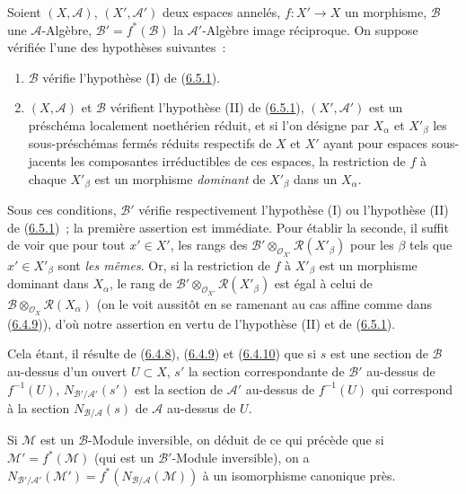 \begin{env}[6.5.4]
\label{II.6.5.4-fr}
Soient $(X,\mathcal{A})$, $(X',\mathcal{A}')$ deux espaces annelés,
$f:X'\to X$ un morphisme, $\mathcal{B}$ une $\mathcal{A}$-Algèbre,
$\mathcal{B}'=f^*(\mathcal{B})$ la $\mathcal{A}'$-Algèbre image réciproque. On
suppose vérifiée l'une des hypothèses suivantes~:
\begin{enumerate}
\item[$1^\circ$] $\mathcal{B}$ vérifie l'hypothèse (I) de
(\hyperref[II.6.5.1-fr]{6.5.1}).
\item[$2^\circ$] $(X,\mathcal{A})$ et $\mathcal{B}$ vérifient l'hypothèse
(II) de (\hyperref[II.6.5.1-fr]{6.5.1}), $(X',\mathcal{A}')$ est un préschéma
localement noethérien réduit, et si l'on désigne par $X_\alpha$ et
$X'_\beta$ les sous-préschémas fermés réduits respectifs de $X$ et $X'$ ayant
pour espaces sous-jacents les composantes irréductibles de ces espaces, la
restriction de $f$ à chaque $X'_\beta$ est un morphisme \emph{dominant} de
$X'_\beta$ dans un $X_\alpha$.
\end{enumerate}
Sous ces conditions, $\mathcal{B}'$ vérifie respectivement l'hypothèse (I) ou
l'hypothèse (II) de (\hyperref[II.6.5.1-fr]{6.5.1})~; la première assertion
est immédiate. Pour établir la seconde, il suffit de voir que pour tout
$x'\in X'$, les rangs des
$\mathcal{B}'\otimes_{\mathcal{O}_{X'}}\mathcal{R}(X'_\beta)$ pour les $\beta$
tels que $x'\in X'_\beta$ sont \emph{les mêmes}. Or, si la restriction de $f$
à $X'_\beta$ est un morphisme dominant dans $X_\alpha$, le rang de
$\mathcal{B}'\otimes_{\mathcal{O}_{X'}}\mathcal{R}(X'_\beta)$ est égal à celui
de $\mathcal{B}\otimes_{\mathcal{O}_X}\mathcal{R}(X_\alpha)$ (on le voit
aussitôt en se ramenant au cas affine comme dans
(\hyperref[II.6.4.9-fr]{6.4.9})), d'où notre assertion en vertu de l'hypothèse
(II) et de (\hyperref[II.6.5.1-fr]{6.5.1}).


Cela étant, il résulte de (\hyperref[II.6.4.8-fr]{6.4.8}),
(\hyperref[II.6.4.9-fr]{6.4.9}) et (\hyperref[II.6.4.10-fr]{6.4.10}) que si
$s$ est une section de $\mathcal{B}$ au-dessus d'un ouvert $U\subset X$,
$s'$ la section correspondante de $\mathcal{B}'$ au-dessus de $f^{-1}(U)$,
$N_{\mathcal{B}'/\mathcal{A}'}(s')$ est la section de $\mathcal{A}'$ au-dessus
de $f^{-1}(U)$ qui correspond à la section
$N_{\mathcal{B}/\mathcal{A}}(s)$ de $\mathcal{A}$ au-dessus de $U$.

Si $\mathcal{M}$ est un $\mathcal{B}$-Module inversible, on déduit de ce qui
précède que si $\mathcal{M}'=f^*(\mathcal{M})$ (qui est un
$\mathcal{B}'$-Module inversible), on a
$N_{\mathcal{B}'/\mathcal{A}'}(\mathcal{M}')
=f^*(N_{\mathcal{B}/\mathcal{A}}(\mathcal{M}))$ à un isomorphisme canonique
près.
\end{env}

